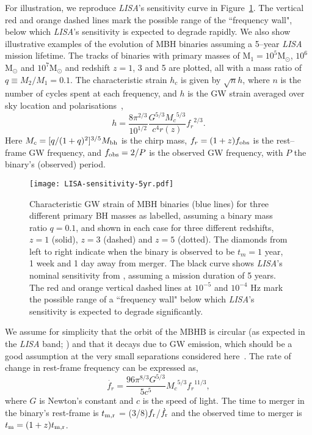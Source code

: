 \documentclass[fleqn,usenatbib]{mnras}
\begin{document}
For illustration, we reproduce {\it LISA}'s sensitivity curve in Figure~\ref{fig:lisa_sensitivity}. The vertical red and orange dashed lines mark the possible range of the ``frequency wall", below which {\it LISA}'s sensitivity is expected to degrade rapidly. We also show illustrative examples of the evolution of MBH binaries assuming a 5--year {\it LISA} mission lifetime.
The tracks of binaries with primary masses of M$_1=10^5$M$_{\odot}$, $10^6$M$_{\odot}$ and $10^7$M$_{\odot}$ and redshift $z=1$, 3 and 5 are plotted, all with a mass ratio of $q\equiv M_2/M_1=0.1$. The characteristic strain $h_c$ is given by $\sqrt{n}h$, where $n$ is the number of cycles spent at each frequency, and $h$ is the GW strain averaged over sky location and polarisations~\citep[see, e.g.][]{Sesana2005a},
\begin{equation}
    h=\frac{8\pi^{2/3}}{10^{1/2}}\frac{G^{5/3}{M_c}^{5/3}}{c^4 r(z)} {f_r}^{2/3}.
\end{equation}
Here $M_c=[q/(1+q)^2]^{3/5} M_{\rm bh}$ is the chirp mass, $f_r=(1+z)f_{\rm obs}$ is the rest--frame GW frequency, and $f_{\rm obs}=2/P$ is the observed GW frequency, with $P$ the binary's (observed) period.

\begin{figure}
    \centering
    \texttt{[image: LISA-sensitivity-5yr.pdf]}
    \caption{Characteristic GW strain of MBH binaries (blue lines) for three different primary BH masses as labelled, assuming a binary mass ratio $q=0.1$, and shown in each case for three different redshifts, $z=1$ (solid), $z=3$ (dashed) and $z=5$ (dotted). The diamonds from left to right indicate when the binary is observed to be $t_m=1$ year, 1 week
    and 1 day away from merger. The black curve shows {\it LISA}'s nominal sensitivity from \citealt{Robson2019}, assuming a mission duration of 5 years. 
    The red and orange vertical dashed lines at $10^{-5}$ and $10^{-4}$ Hz mark the possible range of a ``frequency wall" below which {\it LISA}'s sensitivity is expected to degrade significantly.}
    \label{fig:lisa_sensitivity}
\end{figure}

We assume for simplicity that the orbit of the MBHB is circular (as expected in the {\it LISA} band; \citealt{Munoz+2019,Zrake+2021}) and that it decays due to GW emission, which should be a good assumption at the very small separations considered here~\citep[e.g.][]{Haiman2009a}.  The rate of change in rest-frame frequency can be expressed as,
\begin{equation} \label{eq:f_dot}
    \dot{f_r} = \frac{96\pi^{8/3}G^{5/3}}{5c^5}{M_c}^{5/3}{f_r}^{11/3},
\end{equation}
where $G$ is Newton's constant and $c$ is the speed of light. The time to merger in the binary's rest-frame is
$t_{\rm m,r}$ = (3/8)$f_{\rm r}$/$\dot{f_{\rm r}}$ and the observed time to merger is $t_{\rm m} = (1+z) t_{\rm m,r}$.
\end{document}
